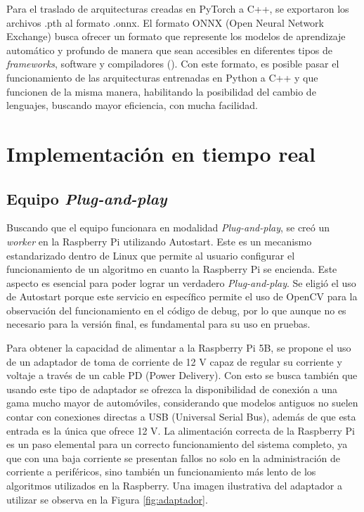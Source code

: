 Para el traslado de arquitecturas creadas en PyTorch a C++, se exportaron los archivos .pth al formato .onnx. El formato ONNX (Open Neural Network Exchange) busca ofrecer un formato que represente los modelos de aprendizaje automático y profundo de manera que sean accesibles en diferentes tipos de \textit{frameworks}, software y compiladores (\cite{ONNX}). Con este formato, es posible pasar el funcionamiento de las arquitecturas entrenadas en Python a C++ y que funcionen de la misma manera, habilitando la posibilidad del cambio de lenguajes, buscando mayor eficiencia, con mucha facilidad.

\section{Implementación en tiempo real}
\subsection{Equipo \textit{Plug-and-play}}
Buscando que el equipo funcionara en modalidad \textit{Plug-and-play}, se creó un \textit{worker} en la Raspberry Pi utilizando Autostart. Este es un mecanismo estandarizado dentro de Linux que permite al usuario configurar el funcionamiento de un algoritmo en cuanto la Raspberry Pi se encienda. Este aspecto es esencial para poder lograr un verdadero \textit{Plug-and-play}. Se eligió el uso de Autostart porque este servicio en específico permite el uso de OpenCV para la observación del funcionamiento en el código de debug, por lo que aunque no es necesario para la versión final, es fundamental para su uso en pruebas.

Para obtener la capacidad de alimentar a la Raspberry Pi 5B, se propone el uso de un adaptador de toma de corriente de 12 V capaz de regular su corriente y voltaje a través de un cable PD (Power Delivery). Con esto se busca también que usando este tipo de adaptador se ofrezca la disponibilidad de conexión a una gama mucho mayor de automóviles, considerando que modelos antiguos no suelen contar con conexiones directas a USB (Universal Serial Bus), además de que esta entrada es la única que ofrece 12 V. La alimentación correcta de la Raspberry Pi es un paso elemental para un correcto funcionamiento del sistema completo, ya que con una baja corriente se presentan fallos no solo en la administración de corriente a periféricos, sino también un funcionamiento más lento de los algoritmos utilizados en la Raspberry. Una imagen ilustrativa del adaptador a utilizar se observa en la Figura \ref{fig:adaptador}.

